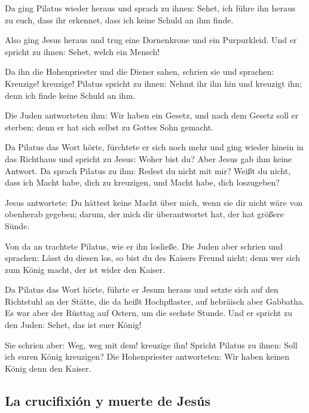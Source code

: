  Da ging Pilatus wieder heraus und sprach zu ihnen: Sehet,
ich führe ihn heraus zu euch, dass ihr erkennet, dass ich keine Schuld
an ihm finde.

 Also ging Jesus heraus und trug eine Dornenkrone und ein
Purpurkleid. Und er spricht zu ihnen: Sehet, welch ein Mensch!

 Da ihn die Hohenpriester und die Diener sahen, schrien
sie und sprachen: Kreuzige! kreuzige! Pilatus spricht zu ihnen: Nehmt
ihr ihn hin und kreuzigt ihn; denn ich finde keine Schuld an ihm.

 Die Juden antworteten ihm: Wir haben ein Gesetz, und nach
dem Gesetz soll er sterben; denn er hat sich selbst zu Gottes Sohn
gemacht.

 Da Pilatus das Wort hörte, fürchtete er sich noch mehr
 und ging wieder hinein in das Richthaus und spricht zu
Jesus: Woher bist du? Aber Jesus gab ihm keine Antwort. 
Da sprach Pilatus zu ihm: Redest du nicht mit mir? Weißt du nicht, dass
ich Macht habe, dich zu kreuzigen, und Macht habe, dich loszugeben?

 Jesus antwortete: Du hättest keine Macht über mich, wenn
sie dir nicht wäre von obenherab gegeben; darum, der mich dir
überantwortet hat, der hat größere Sünde.

 Von da an trachtete Pilatus, wie er ihn losließe. Die
Juden aber schrien und sprachen: Lässt du diesen los, so bist du des
Kaisers Freund nicht; denn wer sich zum König macht, der ist wider den
Kaiser.

 Da Pilatus das Wort hörte, führte er Jesum heraus und
setzte sich auf den Richtstuhl an der Stätte, die da heißt Hochpflaster,
auf hebräisch aber Gabbatha.  Es war aber der Rüsttag auf
Ostern, um die sechste Stunde. Und er spricht zu den Juden: Sehet, das
ist euer König!

 Sie schrien aber: Weg, weg mit dem! kreuzige ihn!
Spricht Pilatus zu ihnen: Soll ich euren König kreuzigen? Die
Hohenpriester antworteten: Wir haben keinen König denn den Kaiser.

\hypertarget{la-crucifixiuxf3n-y-muerte-de-jesuxfas}{%
\subsection{La crucifixión y muerte de
Jesús}\label{la-crucifixiuxf3n-y-muerte-de-jesuxfas}}

